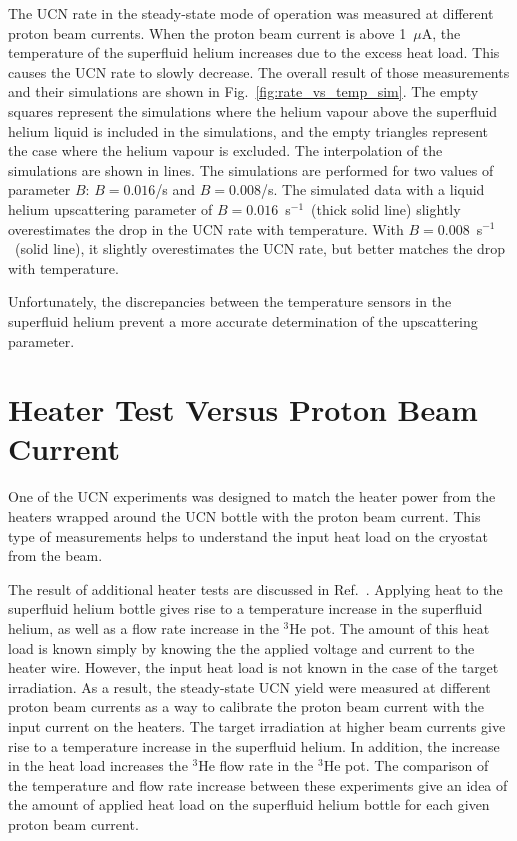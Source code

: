 The UCN rate in the steady-state mode of operation was measured at
different proton beam currents. When the proton beam current is above
1~$\mu$A, the temperature of the superfluid helium increases due to
the excess heat load. This causes the UCN rate to slowly decrease. The
overall result of those measurements and their simulations are shown
in Fig.~\ref{fig:rate_vs_temp_sim}. The empty squares represent the
simulations where the helium vapour above the superfluid helium liquid
is included in the simulations, and the empty triangles represent the
case where the helium vapour is excluded. The interpolation of the
simulations are shown in lines. The simulations are performed for two
values of parameter $B$: $B = 0.016$/s and $B = 0.008$/s. The
simulated data with a liquid helium upscattering parameter of
$B= 0.016$~s$^{-1}$~(thick solid line) slightly overestimates the drop
in the UCN rate with temperature. With $B= 0.008$~s$^{-1}$~(solid
line), it slightly overestimates the UCN rate, but better matches the
drop with temperature.

Unfortunately, the discrepancies between the temperature sensors in
the superfluid helium prevent a more accurate determination of the
upscattering parameter.

\section{Heater Test Versus Proton Beam Current}
One of the UCN experiments was designed to match the heater power from
the heaters wrapped around the UCN bottle with the proton beam
current. This type of measurements helps to understand the input heat
load on the cryostat from the beam.

The result of additional heater tests are discussed in
Ref.~\cite{Florian_thesis}. Applying heat to the superfluid helium
bottle gives rise to a temperature increase in the superfluid helium,
as well as a flow rate increase in the $^3$He pot. The amount of this
heat load is known simply by knowing the the applied voltage and
current to the heater wire. However, the input heat load is not known
in the case of the target irradiation. As a result, the steady-state
UCN yield were measured at different proton beam currents as a way to
calibrate the proton beam current with the input current on the
heaters. The target irradiation at higher beam currents give rise to a
temperature increase in the superfluid helium. In addition, the
increase in the heat load increases the $^3$He flow rate in the $^3$He
pot. The comparison of the temperature and flow rate increase between
these experiments give an idea of the amount of applied heat load on
the superfluid helium bottle for each given proton beam current.

